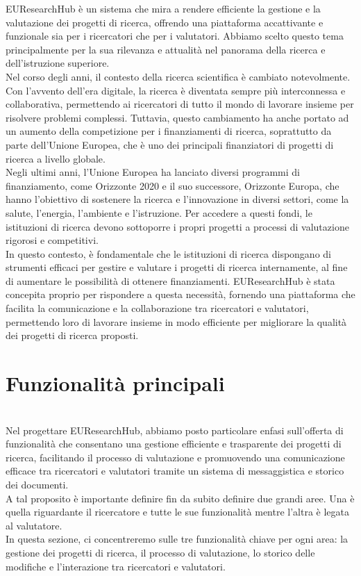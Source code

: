 \documentclass{report}
\begin{document}
EUResearchHub è un sistema che mira a rendere efficiente la gestione e la valutazione dei progetti di ricerca, offrendo una piattaforma accattivante e funzionale sia per i ricercatori che per i valutatori. Abbiamo scelto questo tema principalmente per la sua rilevanza e attualità nel panorama della ricerca e dell'istruzione superiore.\\
Nel corso degli anni, il contesto della ricerca scientifica è cambiato notevolmente. Con l'avvento dell'era digitale, la ricerca è diventata sempre più interconnessa e collaborativa, permettendo ai ricercatori di tutto il mondo di lavorare insieme per risolvere problemi complessi. Tuttavia, questo cambiamento ha anche portato ad un aumento della competizione per i finanziamenti di ricerca, soprattutto da parte dell'Unione Europea, che è uno dei principali finanziatori di progetti di ricerca a livello globale.\\
Negli ultimi anni, l'Unione Europea ha lanciato diversi programmi di finanziamento, come Orizzonte 2020 e il suo successore, Orizzonte Europa, che hanno l'obiettivo di sostenere la ricerca e l'innovazione in diversi settori, come la salute, l'energia, l'ambiente e l'istruzione. Per accedere a questi fondi, le istituzioni di ricerca devono sottoporre i propri progetti a processi di valutazione rigorosi e competitivi.\\
In questo contesto, è fondamentale che le istituzioni di ricerca dispongano di strumenti efficaci per gestire e valutare i progetti di ricerca internamente, al fine di aumentare le possibilità di ottenere finanziamenti. EUResearchHub è stata concepita proprio per rispondere a questa necessità, fornendo una piattaforma che facilita la comunicazione e la collaborazione tra ricercatori e valutatori, permettendo loro di lavorare insieme in modo efficiente per migliorare la qualità dei progetti di ricerca proposti.\\


\section{Funzionalità principali}
\phantom{This text will be invisible}\\
Nel progettare EUResearchHub, abbiamo posto particolare enfasi sull'offerta di funzionalità che consentano una gestione efficiente e trasparente dei progetti di ricerca, facilitando il processo di valutazione e promuovendo una comunicazione efficace tra ricercatori e valutatori tramite un sistema di messaggistica e storico dei documenti. \\
A tal proposito è importante definire fin da subito definire due grandi aree. Una è quella riguardante il ricercatore e tutte le sue funzionalità mentre l’altra è legata al valutatore. \\
In questa sezione, ci concentreremo sulle tre funzionalità chiave per ogni area: la gestione dei progetti di ricerca, il processo di valutazione, lo storico delle modifiche e l'interazione tra ricercatori e valutatori.
\end{document}

